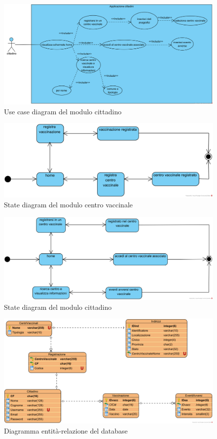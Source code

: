 \begin{figure}[t]
	\includegraphics[width=\textwidth]{./img/UseCaseCittadino}
	\caption{Use case diagram del modulo cittadino}
\end{figure}

\begin{figure}[t]
	\includegraphics[width=\textwidth]{./img/StateMachineDiagramCentroVaccinale}
	\caption{State diagram del modulo centro vaccinale}
\end{figure}

\begin{figure}[t]
	\includegraphics[width=\textwidth]{./img/StateMachineDiagramCittadini}
	\caption{State diagram del modulo cittadino}
\end{figure}

\begin{figure}[t]
	\includegraphics[width=\textwidth]{./img/CentriVaccinaliDB}
	\caption{Diagramma entità-relazione del database}
\end{figure}